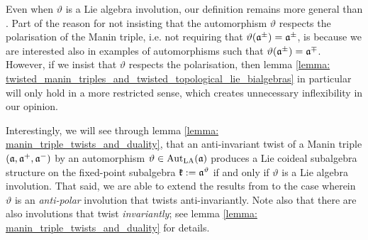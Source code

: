         \begin{remark}
            Even when $\vartheta$ is a Lie algebra involution, our definition remains more general than \cite[Definition 2.1]{belliard_crampe_coideal_subalgebras_from_twisted_manin_triples}. Part of the reason for not insisting that the automorphism $\vartheta$ respects the polarisation of the Manin triple, i.e. not requiring that $\vartheta(\mathfrak{a}^{\pm}) = \mathfrak{a}^{\pm}$, is because we are interested also in examples of automorphisms such that $\vartheta(\mathfrak{a}^{\pm}) = \mathfrak{a}^{\mp}$. However, if we insist that $\vartheta$ respects the polarisation, then lemma \ref{lemma: twisted_manin_triples_and_twisted_topological_lie_bialgebras} in particular will only hold in a more restricted sense, which creates unnecessary inflexibility in our opinion.

            Interestingly, we will see through lemma \ref{lemma: manin_triple_twists_and_duality}, that an anti-invariant twist of a Manin triple $(\mathfrak{a}, \mathfrak{a}^+, \mathfrak{a}^-)$ by an automorphism $\vartheta \in \operatorname{Aut}_{\mathrm{LA}}(\mathfrak{a})$ produces a Lie coideal subalgebra structure on the fixed-point subalgebra $\mathfrak{k} := \mathfrak{a}^{\vartheta}$ if and only if $\vartheta$ is a Lie algebra involution. That said, we are able to extend the results from \cite{belliard_crampe_coideal_subalgebras_from_twisted_manin_triples} to the case wherein $\vartheta$ is an \textit{anti-polar} involution that twists anti-invariantly. Note also that there are also involutions that twist \textit{invariantly}; see lemma \ref{lemma: manin_triple_twists_and_duality} for details.
        \end{remark}

